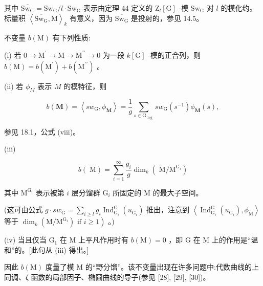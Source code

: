 \documentclass[10pt]{article}
\begin{document}
其中 \(\overline{{\mathrm{{Sw}}}_{\mathrm{G}}} = {\mathrm{{Sw}}}_{\mathrm{G}}/l \cdot  {\mathrm{{Sw}}}_{\mathrm{G}}\) 表示由定理 44 定义的 \({\mathrm{Z}}_{l}\left\lbrack  \mathrm{G}\right\rbrack\) -模 \({\mathrm{{Sw}}}_{\mathrm{G}}\) 对 \(l\) 的模化约。标量积 \({\left\langle  \overline{{\mathrm{{Sw}}}_{\mathrm{G}}},\mathrm{M}\right\rangle  }_{k}\) 有意义，因为 \(\overline{{\mathrm{{Sw}}}_{\mathrm{G}}}\) 是投射的，参见 14.5。

不变量 \(b\left( \mathrm{M}\right)\) 有下列性质:

(i) 若 \(0 \rightarrow  {\mathrm{M}}^{\prime } \rightarrow  \mathrm{M} \rightarrow  {\mathrm{M}}^{\prime \prime } \rightarrow  0\) 为一段 \(k\left\lbrack  \mathrm{G}\right\rbrack\) -模的正合列，则 \(b\left( \mathrm{M}\right)  = b\left( {\mathrm{M}}^{\prime }\right)  + b\left( {\mathrm{M}}^{\prime \prime }\right)\) 。

(ii) 若 \({\phi }_{M}\) 表示 \(M\) 的模特征，则

\[
b\left( \mathbf{M}\right)  = \left\langle  {s{w}_{\mathrm{G}},{\phi }_{\mathbf{M}}}\right\rangle   = \frac{1}{g}\mathop{\sum }\limits_{{s \in  {\mathrm{G}}_{\text{ reg }}}}s{w}_{\mathrm{G}}\left( {s}^{-1}\right) {\phi }_{\mathbf{M}}\left( s\right) ,
\]

参见 18.1，公式 (viii)。

(iii)

\[
b\left( \mathrm{\;M}\right)  = \mathop{\sum }\limits_{{i = 1}}^{\infty }\frac{{g}_{i}}{g}{\dim }_{k}\left( {\mathrm{\;M}/{\mathrm{M}}^{{\mathrm{G}}_{i}}}\right)
\]

其中 \({\mathrm{M}}^{{\mathrm{G}}_{i}}\) 表示被第 \(i\) 层分馏群 \({\mathrm{G}}_{i}\) 所固定的 \(\mathrm{M}\) 的最大子空间。

(这可由公式 \(g \cdot  s{w}_{\mathrm{G}} = \mathop{\sum }\limits_{{i \geq  l}}{g}_{i}{\operatorname{Ind}}_{{\mathrm{G}}_{i}}^{\mathrm{G}}\left( {u}_{{\mathrm{G}}_{i}}\right)\) 推出，注意到 \(\left\langle  {{\operatorname{Ind}}_{{\mathrm{G}}_{i}}^{\mathrm{G}}\left( {u}_{{\mathrm{G}}_{i}}\right) ,{\phi }_{\mathrm{M}}}\right\rangle\) 等于 \(\left. {{\dim }_{k}\left( {\mathrm{M}/{\mathrm{M}}^{{\mathrm{G}}_{i}}}\right) \text{ if }i \geq  1}\right)\) 。)

(iv) 当且仅当 \({\mathrm{G}}_{1}\) 在 \(\mathrm{M}\) 上平凡作用时有 \(b\left( \mathrm{M}\right)  = 0\) ，即 \(\mathrm{G}\) 在 \(\mathrm{M}\) 上的作用是“温和”的。[此句从 (iii) 得出。]

因此 \(b\left( \mathrm{M}\right)\) 度量了模 M 的“野分馏”。该不变量出现在许多问题中:代数曲线的上同调、ζ 函数的局部因子、椭圆曲线的导子(参见 [28], [29], [30])。
\end{document}
